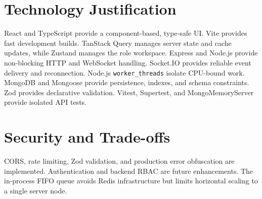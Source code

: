 \documentclass[11pt,a4paper]{article}
\begin{document}
\section{Technology Justification}
React and TypeScript provide a component-based, type-safe UI. Vite provides fast development builds. TanStack Query manages server state and cache updates, while Zustand manages the role workspace. Express and Node.js provide non-blocking HTTP and WebSocket handling. Socket.IO provides reliable event delivery and reconnection. Node.js \texttt{worker\_threads} isolate CPU-bound work. MongoDB and Mongoose provide persistence, indexes, and schema constraints. Zod provides declarative validation. Vitest, Supertest, and MongoMemoryServer provide isolated API tests.

\section{Security and Trade-offs}
CORS, rate limiting, Zod validation, and production error obfuscation are implemented. Authentication and backend RBAC are future enhancements. The in-process FIFO queue avoids Redis infrastructure but limits horizontal scaling to a single server node.
\end{document}
